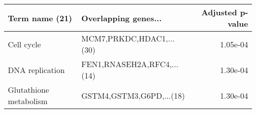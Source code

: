 \begin{tabular}{llr}
\toprule
        Term name (21) &       Overlapping genes... &  Adjusted p-value \\
\midrule
            Cell cycle &   MCM7,PRKDC,HDAC1,...(30) &          1.05e-04 \\
       DNA replication & FEN1,RNASEH2A,RFC4,...(14) &          1.30e-04 \\
Glutathione metabolism &   GSTM4,GSTM3,G6PD,...(18) &          1.30e-04 \\
\bottomrule
\end{tabular}
